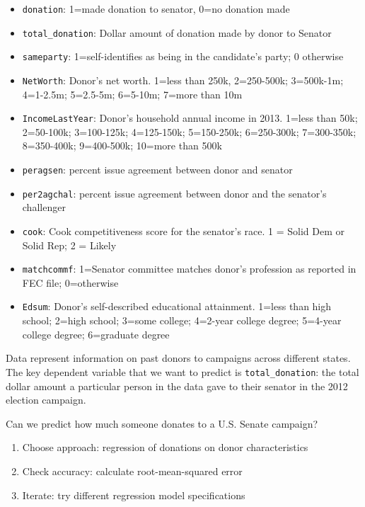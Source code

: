 \documentclass[
  letterpaper,
  DIV=11,
  numbers=noendperiod]{scrreprt}
\providecommand{\tightlist}{%
  \setlength{\itemsep}{0pt}\setlength{\parskip}{0pt}}\usepackage{longtable,booktabs,array}
\begin{document}
\begin{itemize}
\tightlist
\item
  \texttt{donation}: 1=made donation to senator, 0=no donation made
\item
  \texttt{total\_donation}: Dollar amount of donation made by donor to
  Senator
\item
  \texttt{sameparty}: 1=self-identifies as being in the candidate's
  party; 0 otherwise
\item
  \texttt{NetWorth}: Donor's net worth. 1=less than 250k, 2=250-500k;
  3=500k-1m; 4=1-2.5m; 5=2.5-5m; 6=5-10m; 7=more than 10m
\item
  \texttt{IncomeLastYear}: Donor's household annual income in 2013.
  1=less than 50k; 2=50-100k; 3=100-125k; 4=125-150k; 5=150-250k;
  6=250-300k; 7=300-350k; 8=350-400k; 9=400-500k; 10=more than 500k
\item
  \texttt{peragsen}: percent issue agreement between donor and senator
\item
  \texttt{per2agchal}: percent issue agreement between donor and the
  senator's challenger
\item
  \texttt{cook}: Cook competitiveness score for the senator's race. 1 =
  Solid Dem or Solid Rep; 2 = Likely
\item
  \texttt{matchcommf}: 1=Senator committee matches donor's profession as
  reported in FEC file; 0=otherwise
\item
  \texttt{Edsum}: Donor's self-described educational attainment. 1=less
  than high school; 2=high school; 3=some college; 4=2-year college
  degree; 5=4-year college degree; 6=graduate degree
\end{itemize}

Data represent information on past donors to campaigns across different
states. The key dependent variable that we want to predict is
\texttt{total\_donation}: the total dollar amount a particular person in
the data gave to their senator in the 2012 election campaign.

Can we predict how much someone donates to a U.S. Senate campaign?

\begin{enumerate}
\def\labelenumi{\arabic{enumi}.}
\tightlist
\item
  Choose approach: regression of donations on donor characteristics
\item
  Check accuracy: calculate root-mean-squared error
\item
  Iterate: try different regression model specifications
\end{enumerate}
\end{document}
